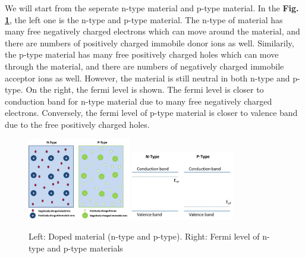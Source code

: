 \documentclass[a4paper, 12pt, titlepage,oneside,drop]{kthesis}
\begin{document}
We will start from the seperate n-type material and p-type material. In the \textbf{Fig. \ref{dopedmaterials}}, the left one is the n-type and p-type material. The n-type of material has many free negatively charged electrons which can move around the material, and there are numbers of positively 
charged immobile donor ions as well. Similarily, the p-type material has many free positively charged holes which can move through the material, and there are numbers of negatively charged immobile acceptor ions as well. However,
the material is still neutral in both n-type and p-type. On the right, the fermi level is shown. The fermi level is closer to conduction band for n-type material due to many free negatively charged electrons. Conversely, the fermi level
of p-type material is closer to valence band due to the free positively charged holes.



\begin{figure}[H]
    \begin{center}
            \includegraphics[width=0.4\textwidth,clip]{sepratepn.jpg}
            \includegraphics[width=0.4\textwidth,clip]{sepratepn1.jpg}
     \end{center}
    \caption{Left: Doped material (n-type and p-type). Right: Fermi level of n-type and p-type materials}      
    \label{dopedmaterials}
\end{figure}
\end{document}

